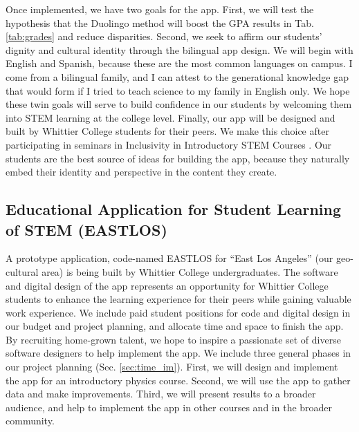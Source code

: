 \documentclass[11pt]{amsart}
\begin{document}
Once implemented, we have two goals for the app.  First, we will test the hypothesis that the Duolingo method will boost the GPA results in Tab. \ref{tab:grades} and reduce disparities.  Second, we seek to affirm our students' dignity and cultural identity through the bilingual app design.  We will begin with English and Spanish, because these are the most common languages on campus.  I come from a bilingual family, and I can attest to the generational knowledge gap that would form if I tried to teach science to my family in English only.  We hope these twin goals will serve to build confidence in our students by welcoming them into STEM learning at the college level.  Finally, our app will be designed and built by Whittier College students for their peers.  We make this choice after participating in seminars in Inclusivity in Introductory STEM Courses \cite{cottrell1,cottrell2}.  Our students are the best source of ideas for building the app, because they naturally embed their identity and perspective in the content they create.

\subsection{Educational Application for Student Learning of STEM (EASTLOS)}

A prototype application, code-named EASTLOS for ``East Los Angeles'' (our geo-cultural area) is being built by Whittier College undergraduates.  The software and digital design of the app represents an opportunity for Whittier College students to enhance the learning experience for their peers while gaining valuable work experience.  We include paid student positions for code and digital design in our budget and project planning, and allocate time and space to finish the app.  By recruiting home-grown talent, we hope to inspire a passionate set of diverse software designers to help implement the app.  We include three general phases in our project planning (Sec. \ref{sec:time_im}).  First, we will design and implement the app for an introductory physics course.  Second, we will use the app to gather data and make improvements.  Third, we will present results to a broader audience, and help to implement the app in other courses and in the broader community. 
\end{document}
